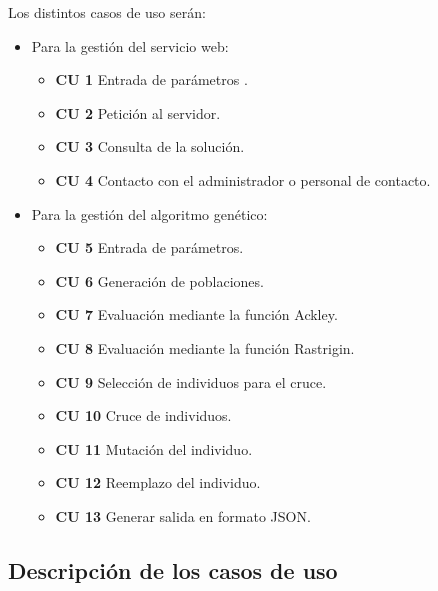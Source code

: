 Los distintos casos de uso serán:
\begin{itemize}
	\item Para la gestión del servicio web:
	\begin{itemize}

		\item \textbf{CU 1} Entrada de parámetros .
		\item \textbf{CU 2} Petición al servidor.	
		\item \textbf{CU 3} Consulta de la solución.
		\item \textbf{CU 4} Contacto con el administrador o personal de contacto.
	\end{itemize}
	
	\item Para la gestión del algoritmo genético:
	\begin{itemize}
		\item \textbf{CU 5} Entrada de parámetros.
		\item \textbf{CU 6} Generación de poblaciones.
		\item \textbf{CU 7} Evaluación mediante la función Ackley.
		\item \textbf{CU 8} Evaluación mediante la función Rastrigin.
		\item \textbf{CU 9} Selección de individuos para el cruce.
		\item \textbf{CU 10} Cruce de individuos.
		\item \textbf{CU 11} Mutación del individuo.
		\item \textbf{CU 12} Reemplazo del individuo.
		\item \textbf{CU 13} Generar salida en formato JSON.
	\end{itemize}
	
\end{itemize}



\bigskip
\subsection{Descripción de los casos de uso}
\bigskip


